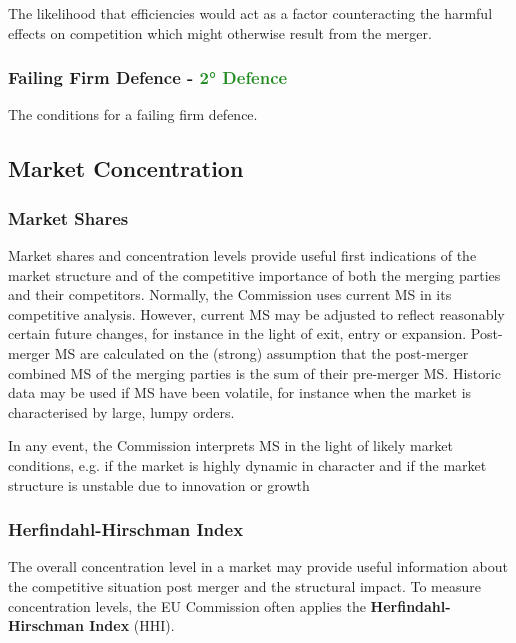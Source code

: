             The likelihood that efficiencies would act as a factor counteracting the harmful effects on competition which might otherwise result from the merger.

        \subsubsection{Failing Firm Defence - \textcolor{ForestGreen}{2° Defence}}

            The conditions for a failing firm defence.

    \subsection{Market Concentration}\label{AC}

        \subsubsection{Market Shares}

            Market shares and concentration levels provide useful first indications of the market structure and of the competitive importance of both the merging parties and their competitors. Normally, the Commission uses current MS in its competitive analysis. However, current MS may be adjusted to reflect reasonably certain future changes, for instance in the light of exit, entry or expansion. Post-merger MS are calculated on the (strong) assumption that the post-merger combined MS of the merging parties is the sum of their pre-merger MS. Historic data may be used if MS have been volatile, for instance when the market is characterised by large, lumpy orders. 
            
            In any event, the Commission interprets MS in the light of likely market conditions, e.g. if the market is highly dynamic in character and if the market structure is unstable due to innovation or growth

        \subsubsection{Herfindahl-Hirschman Index}

            The overall concentration level in a market may provide useful information about the competitive situation post merger and the structural impact. To measure concentration levels, the EU Commission often applies the \textbf{Herfindahl-Hirschman Index} (HHI). 
            
